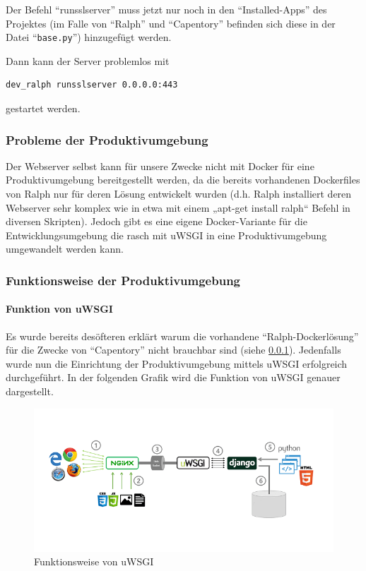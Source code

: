 Der Befehl ``runsslserver'' muss jetzt nur noch in den
``Installed-Apps'' des Projektes (im Falle von ``Ralph'' und
``Capentory'' befinden sich diese in der Datei ``\texttt{base.py}'')
hinzugefügt werden.

Dann kann der Server problemlos mit

\begin{verbatim}
dev_ralph runsslserver 0.0.0.0:443
\end{verbatim}

gestartet werden.

\hypertarget{probleme-der-produktivumgebung}{%
\subsubsection{Probleme der
Produktivumgebung}\label{probleme-der-produktivumgebung}}

Der Webserver selbst kann für unsere Zwecke nicht mit Docker für eine
Produktivumgebung bereitgestellt werden, da die bereits vorhandenen
Dockerfiles von Ralph nur für deren Lösung entwickelt wurden (d.h. Ralph
installiert deren Webserver sehr komplex wie in etwa mit einem „apt-get
install ralph`` Befehl in diversen Skripten). Jedoch gibt es eine eigene
Docker-Variante für die Entwicklungsumgebung die rasch mit uWSGI in eine
Produktivumgebung umgewandelt werden kann.

\hypertarget{funktionsweise-der-produktivumgebung}{%
\subsubsection{Funktionsweise der
Produktivumgebung}\label{funktionsweise-der-produktivumgebung}}

\hypertarget{funktion-von-uwsgi}{%
\paragraph{Funktion von uWSGI}\label{funktion-von-uwsgi}}

Es wurde bereits desöfteren erklärt warum die vorhandene
``Ralph-Dockerlösung'' für die Zwecke von ``Capentory'' nicht brauchbar
sind (siehe \ref{probleme-der-produktivumgebung}). Jedenfalls wurde nun
die Einrichtung der Produktivumgebung mittels uWSGI erfolgreich
durchgeführt. In der folgenden Grafik wird die Funktion von uWSGI
genauer dargestellt.

\begin{figure}[ht]
\centering
\includegraphics{uwsgi.png}
\caption{Funktionsweise von uWSGI}
\end{figure}

